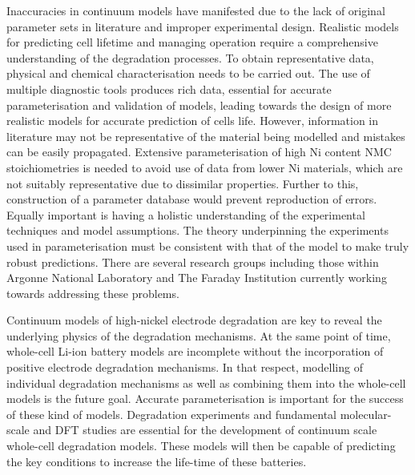 \documentclass[journal=jacsat,manuscript=article]{achemso}
\begin{document}
Inaccuracies in continuum models have manifested due to the lack of original parameter sets in literature and improper experimental design. Realistic models for predicting cell lifetime and managing operation require a comprehensive understanding of the degradation processes. To obtain representative data, physical and chemical characterisation needs to be carried out. The use of multiple diagnostic tools produces rich data, essential for accurate parameterisation and validation of models, leading towards the design of more realistic models for accurate prediction of cells life. However, information in literature may not be representative of the material being modelled and mistakes can be easily propagated.\cite{Howey_2020} Extensive parameterisation of high Ni content NMC stoichiometries is needed to avoid use of data from lower Ni materials, which are not suitably representative due to dissimilar properties. Further to this, construction of a parameter database would prevent reproduction of errors. Equally important is having a holistic understanding of the experimental techniques and model assumptions. The theory underpinning the experiments used in parameterisation must be consistent with that of the model to make truly robust predictions. There are several research groups including those within Argonne National Laboratory and The Faraday Institution currently working towards addressing these problems.

Continuum models of high-nickel electrode degradation are key to reveal the underlying physics of the degradation mechanisms. At the same point of time, whole-cell Li-ion battery models are incomplete without the incorporation of positive electrode degradation mechanisms. In that respect, modelling of individual degradation mechanisms as well as combining them into the whole-cell models is the future goal. Accurate parameterisation is important for the success of these kind of models. Degradation experiments and fundamental molecular-scale and DFT studies are essential for the development of continuum scale whole-cell degradation models.\cite{Sulzer_2020} These models will then be capable of predicting the key conditions to increase the life-time of these batteries.
\end{document}
